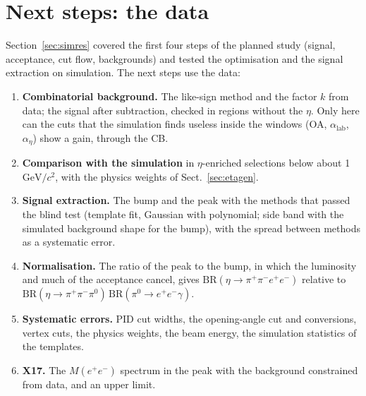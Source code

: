 \documentclass[11pt,a4paper]{article}
\newcommand{\piz}{\ensuremath{\pi^{0}}\xspace}
\newcommand{\ee}{\ensuremath{e^{+}e^{-}}\xspace}
\newcommand{\pipi}{\ensuremath{\pi^{+}\pi^{-}}\xspace}
\newcommand{\ppee}{\ensuremath{\pi^{+}\pi^{-}e^{+}e^{-}}\xspace}
\newcommand{\Mee}{\ensuremath{M(e^{+}e^{-})}\xspace}
\newcommand{\GeVcc}{\ensuremath{\mathrm{GeV}/c^{2}}\xspace}
\begin{document}
\section{Next steps: the data}
\label{sec:next}
Section~\ref{sec:simres} covered the first four steps of the planned study (signal, acceptance,
cut flow, backgrounds) and tested the optimisation and the signal extraction on simulation. The
next steps use the data:
\begin{enumerate}
\item \textbf{Combinatorial background.} The like-sign method and the factor $k$ from data; the
      signal after subtraction, checked in regions without the $\eta$. Only here can the cuts that
      the simulation finds useless inside the windows (OA, $\alpha_{\mathrm{lab}}$, $\alpha_\eta$)
      show a gain, through the CB.
\item \textbf{Comparison with the simulation} in $\eta$-enriched selections below about
      1\,\GeVcc, with the physics weights of Sect.~\ref{sec:etagen}.
\item \textbf{Signal extraction.} The bump and the peak with the methods that passed the blind
      test (template fit, Gaussian with polynomial; side band with the simulated background shape
      for the bump), with the spread between methods as a systematic error.
\item \textbf{Normalisation.} The ratio of the peak to the bump, in which the luminosity and much
      of the acceptance cancel, gives $\mathrm{BR}(\eta\to\ppee)$ relative to
      $\mathrm{BR}(\eta\to\pipi\piz)\,\mathrm{BR}(\piz\to\ee\gamma)$.
\item \textbf{Systematic errors.} PID cut widths, the opening-angle cut and conversions, vertex
      cuts, the physics weights, the beam energy, the simulation statistics of the templates.
\item \textbf{X17.} The \Mee spectrum in the peak with the background constrained from data, and
      an upper limit.
\end{enumerate}

\appendix
\end{document}
